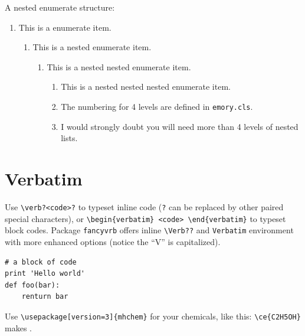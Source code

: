 \documentclass[draft]{emory}
\begin{document}
A nested enumerate structure:
\begin{enumerate}
  \item This is a enumerate item.
  \begin{enumerate}
    \item This is a nested enumerate item.
    \begin{enumerate}
      \item This is a nested nested enumerate item.
      \begin{enumerate}
        \item This is a nested nested nested enumerate item. 
        \item The numbering for 4 levels are defined in \Verb|emory.cls|.
        \item I would strongly doubt you will need more than 4 levels of nested lists.
      \end{enumerate}
    \end{enumerate}
  \end{enumerate}    
\end{enumerate}

\section{Verbatim}

Use \Verb|\verb?<code>?| to typeset inline code  (\Verb|?| can be replaced by
other paired special characters),
or  \Verb|\begin{verbatim} <code> \end{verbatim}| to typeset block codes.
Package \Verb|fancyvrb| offers inline \Verb|\Verb??| and \Verb|Verbatim| environment with more enhanced
options (notice the ``V'' is capitalized).

\begin{Verbatim}
# a block of code
print 'Hello world'
def foo(bar):
    renturn bar
\end{Verbatim}


Use \Verb|\usepackage[version=3]{mhchem}| for your chemicals, like this:
\Verb|\ce{C2H5OH}| makes .
\end{document}
